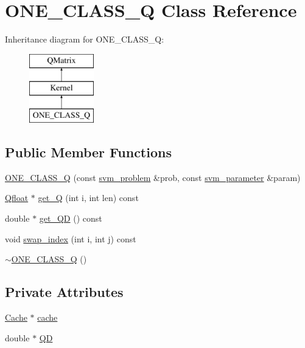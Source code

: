 \hypertarget{classONE__CLASS__Q}{}\section{O\+N\+E\+\_\+\+C\+L\+A\+S\+S\+\_\+Q Class Reference}
\label{classONE__CLASS__Q}
Inheritance diagram for O\+N\+E\+\_\+\+C\+L\+A\+S\+S\+\_\+Q\+:\begin{figure}[H]
\begin{center}
\leavevmode
\includegraphics[height=3.000000cm]{classONE__CLASS__Q}
\end{center}
\end{figure}
\subsection*{Public Member Functions}
\begin{DoxyCompactItemize}
\item 
\hyperlink{classONE__CLASS__Q_a759ec4e3e00887ed848cf3f79ab7065f}{O\+N\+E\+\_\+\+C\+L\+A\+S\+S\+\_\+Q} (const \hyperlink{structsvm__problem}{svm\+\_\+problem} \&prob, const \hyperlink{structsvm__parameter}{svm\+\_\+parameter} \&param)
\item 
\hyperlink{svm__core_8cpp_a8755d90a54ecfb8d15051af3e0542592}{Qfloat} $\ast$ \hyperlink{classONE__CLASS__Q_a1f8501234022e017cf46c4dfb2da9d31}{get\+\_\+Q} (int i, int len) const 
\item 
double $\ast$ \hyperlink{classONE__CLASS__Q_a882480d4370d8a89d667a28c3ed68a73}{get\+\_\+\+QD} () const 
\item 
void \hyperlink{classONE__CLASS__Q_ad8bc86ca742c27d82718346388f83fad}{swap\+\_\+index} (int i, int j) const 
\item 
\hyperlink{classONE__CLASS__Q_a569ea8969478398736d70eacc84edbad}{$\sim$\+O\+N\+E\+\_\+\+C\+L\+A\+S\+S\+\_\+Q} ()
\end{DoxyCompactItemize}
\subsection*{Private Attributes}
\begin{DoxyCompactItemize}
\item 
\hyperlink{classCache}{Cache} $\ast$ \hyperlink{classONE__CLASS__Q_ac9b44c80098f3dfb45b1119b9db50907}{cache}
\item 
double $\ast$ \hyperlink{classONE__CLASS__Q_a12994904e59c98ac7f7ec964ea23b7b4}{QD}
\end{DoxyCompactItemize}
